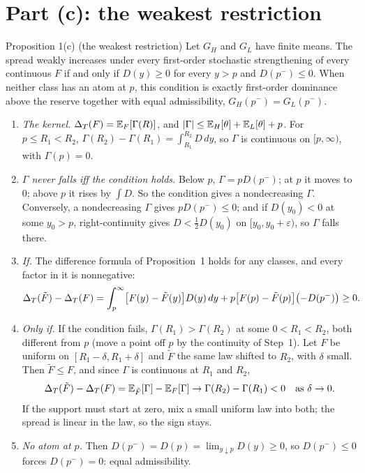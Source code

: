 \section{Part (c): the weakest restriction}\label{sec:auction-weakest}

\begin{paperresult}{Proposition 1(c) (the weakest restriction)}
Let \(G_H\) and \(G_L\) have finite means. The spread weakly increases under every first-order stochastic
strengthening of every continuous \(F\) if and only if \(D(y)\ge0\) for every \(y>p\) and \(D(p^-)\le0\). When
neither class has an atom at \(p\), this condition is exactly first-order dominance above the reserve together
with equal admissibility, \(G_H(p^-)=G_L(p^-)\).
\end{paperresult}

\begin{derivation}
\begin{enumerate}[label=\textit{Step \arabic*.},leftmargin=*,itemsep=0.3em]
\item \emph{The kernel.} \(\Delta_T(F)=\mathbb{E}_F[\Gamma(R)]\), and \(|\Gamma|\le\mathbb{E}_H[\theta]+\mathbb{E}_L[\theta]+p\). For \(p\le R_1<R_2\), \(\Gamma(R_2)-\Gamma(R_1)=\int_{R_1}^{R_2}D\,dy\), so \(\Gamma\) is continuous on \([p,\infty)\), with \(\Gamma(p)=0\).
\item \emph{\(\Gamma\) never falls iff the condition holds.} Below \(p\), \(\Gamma=pD(p^-)\); at \(p\) it moves to \(0\); above \(p\) it rises by \(\int D\). So the condition gives a nondecreasing \(\Gamma\). Conversely, a nondecreasing \(\Gamma\) gives \(pD(p^-)\le0\); and if \(D(y_0)<0\) at some \(y_0>p\), right-continuity gives \(D<\tfrac12D(y_0)\) on \([y_0,y_0+\varepsilon)\), so \(\Gamma\) falls there.
\item \emph{If.} The difference formula of Proposition~1 holds for any classes, and every factor in it is nonnegative:
\[
\Delta_T(\tilde F)-\Delta_T(F)=\int_p^\infty\bigl[F(y)-\tilde F(y)\bigr]D(y)\,dy+p\bigl[F(p)-\tilde F(p)\bigr]\bigl(-D(p^-)\bigr)\ge0.
\]
\item \emph{Only if.} If the condition fails, \(\Gamma(R_1)>\Gamma(R_2)\) at some \(0<R_1<R_2\), both different from \(p\) (move a point off \(p\) by the continuity of Step~1). Let \(F\) be uniform on \([R_1-\delta,R_1+\delta]\) and \(\tilde F\) the same law shifted to \(R_2\), with \(\delta\) small. Then \(\tilde F\le F\), and since \(\Gamma\) is continuous at \(R_1\) and \(R_2\),
\[
\Delta_T(\tilde F)-\Delta_T(F)=\mathbb{E}_{\tilde F}[\Gamma]-\mathbb{E}_F[\Gamma]\to\Gamma(R_2)-\Gamma(R_1)<0\quad\text{as }\delta\to0.
\]
If the support must start at zero, mix a small uniform law into both; the spread is linear in the law, so the sign stays.
\item \emph{No atom at \(p\).} Then \(D(p^-)=D(p)=\lim_{y\downarrow p}D(y)\ge0\), so \(D(p^-)\le0\) forces \(D(p^-)=0\): equal admissibility.
\end{enumerate}
\end{derivation}

